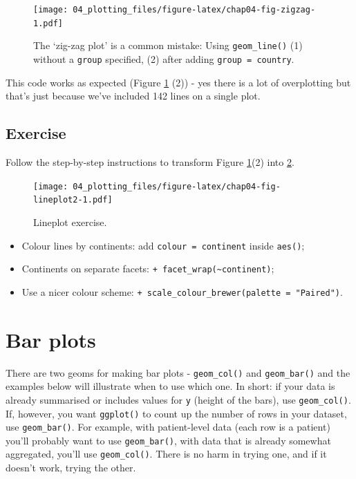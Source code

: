 \documentclass[
  12pt,
  krantz2]{krantz}
\providecommand{\tightlist}{%
  \setlength{\itemsep}{0pt}\setlength{\parskip}{0pt}}
\begin{document}
\begin{figure}
\centering
\texttt{[image: 04\_plotting\_files/figure-latex/chap04-fig-zigzag-1.pdf]}
\caption{\label{fig:chap04-fig-zigzag}The `zig-zag plot' is a common mistake: Using \texttt{geom\_line()} (1) without a \texttt{group} specified, (2) after adding \texttt{group\ =\ country}.}
\end{figure}

This code works as expected (Figure \ref{fig:chap04-fig-zigzag} (2)) - yes there is a lot of overplotting but that's just because we've included 142 lines on a single plot.

\hypertarget{chap04-ex-lineplot}{%
\subsection{Exercise}\label{chap04-ex-lineplot}}

Follow the step-by-step instructions to transform Figure \ref{fig:chap04-fig-zigzag}(2) into \ref{fig:chap04-fig-lineplot2}.

\begin{figure}
\centering
\texttt{[image: 04\_plotting\_files/figure-latex/chap04-fig-lineplot2-1.pdf]}
\caption{\label{fig:chap04-fig-lineplot2}Lineplot exercise.}
\end{figure}

\begin{itemize}
\tightlist
\item
  Colour lines by continents: add \texttt{colour\ =\ continent} inside \texttt{aes()};
\item
  Continents on separate facets: \texttt{+\ facet\_wrap(\textasciitilde{}continent)};
\item
  Use a nicer colour scheme: \texttt{+\ scale\_colour\_brewer(palette\ =\ "Paired")}.
\end{itemize}

\hypertarget{bar-plots}{%
\section{Bar plots}\label{bar-plots}}


There are two geoms for making bar plots - \texttt{geom\_col()} and \texttt{geom\_bar()} and the examples below will illustrate when to use which one.
In short: if your data is already summarised or includes values for \texttt{y} (height of the bars), use \texttt{geom\_col()}.
If, however, you want \texttt{ggplot()} to count up the number of rows in your dataset, use \texttt{geom\_bar()}.
For example, with patient-level data (each row is a patient) you'll probably want to use \texttt{geom\_bar()}, with data that is already somewhat aggregated, you'll use \texttt{geom\_col()}.
There is no harm in trying one, and if it doesn't work, trying the other.
\end{document}
